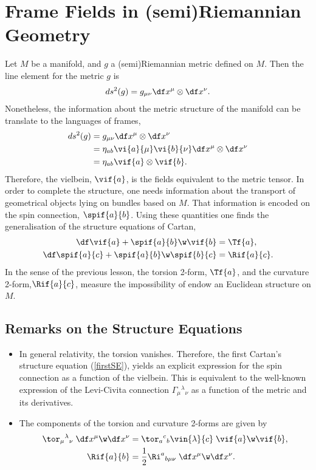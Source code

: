 \section{Frame Fields in (semi)Riemannian Geometry}


Let $M$ be a manifold, and $g$ a (semi)Riemannian metric defined on $M$. Then the line element for the metric $g$ is
\begin{align}
  ds^2(g) = g_{\mu\nu}\df x^\mu \otimes\df x^\nu.
\end{align}
Nonetheless, the information about the metric structure of the manifold can be translate to the languages of frames,
\begin{align}
  ds^2(g) &= g_{\mu\nu}\df x^\mu \otimes\df x^\nu\\
  &= \eta_{ab} \vi{a}{\mu}\vi{b}{\nu}\df x^\mu \otimes\df x^\nu\\
  &=\eta_{ab}\vif{a}\otimes\vif{b}.
\end{align}
Therefore, the vielbein, $\vif{a}$, is the fields equivalent to the metric tensor. In order to complete the structure, one needs information about the transport of geometrical objects lying on bundles based on $M$. That information is encoded on the spin connection, $\spif{a}{b}$. Using these quantities one finds  the generalisation of the structure equations of Cartan,
\begin{align}
  \df\vif{a} +\spif{a}{b}\w\vif{b} &= \Tf{a},\label{firstSE}\\
  \df\spif{a}{c}+\spif{a}{b}\w\spif{b}{c} &= \Rif{a}{c}\label{secondSE}.
\end{align}
In the sense of the previous lesson, the torsion 2-form, $\Tf{a}$, and the curvature 2-form,$\Rif{a}{c}$, measure the impossibility of endow an Euclidean structure on $M$.

\subsection*{Remarks on the Structure Equations}

\begin{itemize}
\item In general relativity, the torsion vanishes. Therefore, the first Cartan's structure equation (\ref{firstSE}), yields an explicit expression for the spin connection as a function of the vielbein. This is equivalent to the well-known expression of the Levi-Civita connection $\Gamma_\mu{}^\lambda{}_\nu$ as a function of the metric and its derivatives.
\item The components of the torsion and curvature 2-forms are given by
  \begin{align}
    \tor_\mu{}^\lambda{}_\nu \;\df x^\mu\w\df x^\nu &= \tor_a{}^c{}_b \vin{\lambda}{c}\;\vif{a}\w\vif{b},\\
    \Rif{a}{b} &= \frac{1}{2}\Ri^a{}_{b\mu\nu}\;\df x^\mu\w\df x^\nu.
  \end{align}
\end{itemize}

